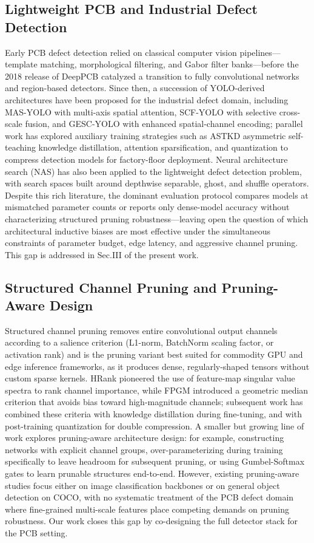 ﻿\documentclass[conference]{IEEEtran}
\begin{document}
\subsection{Lightweight PCB and Industrial Defect Detection}
Early PCB defect detection relied on classical computer vision pipelines—template matching, morphological filtering, and Gabor filter banks—before the 2018 release of DeepPCB catalyzed a transition to fully convolutional networks and region-based detectors. Since then, a succession of YOLO-derived architectures have been proposed for the industrial defect domain, including MAS-YOLO with multi-axis spatial attention, SCF-YOLO with selective cross-scale fusion, and GESC-YOLO with enhanced spatial-channel encoding; parallel work has explored auxiliary training strategies such as ASTKD asymmetric self-teaching knowledge distillation, attention sparsification, and quantization to compress detection models for factory-floor deployment. Neural architecture search (NAS) has also been applied to the lightweight defect detection problem, with search spaces built around depthwise separable, ghost, and shuffle operators. Despite this rich literature, the dominant evaluation protocol compares models at mismatched parameter counts or reports only dense-model accuracy without characterizing structured pruning robustness—leaving open the question of which architectural inductive biases are most effective under the simultaneous constraints of parameter budget, edge latency, and aggressive channel pruning. This gap is addressed in Sec.III of the present work.

\subsection{Structured Channel Pruning and Pruning-Aware Design}
Structured channel pruning removes entire convolutional output channels according to a salience criterion (L1-norm, BatchNorm scaling factor, or activation rank) and is the pruning variant best suited for commodity GPU and edge inference frameworks, as it produces dense, regularly-shaped tensors without custom sparse kernels. HRank pioneered the use of feature-map singular value spectra to rank channel importance, while FPGM introduced a geometric median criterion that avoids bias toward high-magnitude channels; subsequent work has combined these criteria with knowledge distillation during fine-tuning, and with post-training quantization for double compression. A smaller but growing line of work explores pruning-aware architecture design: for example, constructing networks with explicit channel groups, over-parameterizing during training specifically to leave headroom for subsequent pruning, or using Gumbel-Softmax gates to learn prunable structures end-to-end. However, existing pruning-aware studies focus either on image classification backbones or on general object detection on COCO, with no systematic treatment of the PCB defect domain where fine-grained multi-scale features place competing demands on pruning robustness. Our work closes this gap by co-designing the full detector stack for the PCB setting.
\end{document}
